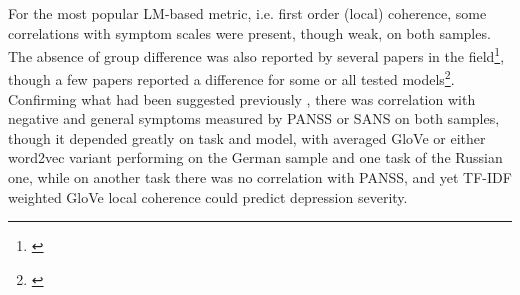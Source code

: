 For the most popular LM-based metric, i.e. first order (local) coherence, some correlations with symptom scales were present, though weak, on both samples. The absence of group difference was also reported by several papers in the field\footnote{\cite{iter2018automatic, just2020modeling, hitczenko2021understanding, bilgrami2022construct, haas2020linking}}, though a few papers reported a difference for some or all tested models\footnote{\cite{iter2018automatic, just2019coherence, morgan2021natural, ryazanskaya2020thesis}}. Confirming what had been suggested previously \citep{ryazanskaya2020thesis, just2023validation, parola2022speech}, there was correlation with negative and general symptoms measured by PANSS or SANS on both samples, though it depended greatly on task and model, with averaged GloVe or either word2vec variant performing on the German sample and one task of the Russian one, while on another task there was no correlation with PANSS, and yet TF-IDF weighted GloVe local coherence could predict depression severity.




